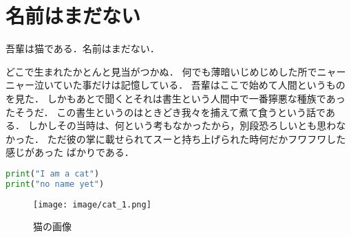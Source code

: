\section{名前はまだない}
吾輩は猫である．名前はまだない．

どこで生まれたかとんと見当がつかぬ．
何でも薄暗いじめじめした所でニャーニャー泣いていた事だけは記憶している．
吾輩はここで始めて人間というものを見た．
しかもあとで聞くとそれは書生という人間中で一番獰悪な種族であったそうだ．
この書生というのはときどき我々を捕えて煮て食うという話である．
しかしその当時は、何という考もなかったから，別段恐ろしいとも思わなかった．
ただ彼の掌に載せられてスーと持ち上げられた時何だかフワフワした感じがあった
ばかりである．

\begin{lstlisting}[language=python,caption=cat.py,frame=single]
print("I am a cat")
print("no name yet")
\end{lstlisting}

\begin{figure}[H]
    \centering
    \texttt{[image: image/cat\_1.png]}
    \caption{猫の画像 \cite{Freecatp65:online}}
    \label{fig:cat}
\end{figure}
